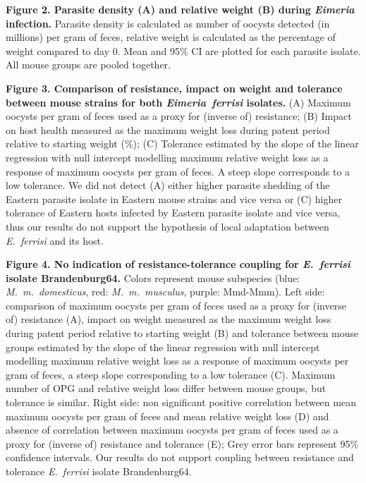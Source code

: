 \documentclass[12pt]{article}
\begin{document}
\textbf{Figure 2. Parasite density (A) and relative weight (B) during \textit{Eimeria} infection.} Parasite density is calculated as number of oocysts detected (in millions) per gram of feces, relative weight is calculated as the percentage of weight compared to day 0. Mean and 95\% CI are plotted for each parasite isolate. All mouse groups are pooled together.

\textbf{Figure 3. Comparison of resistance, impact on weight and tolerance between mouse strains for both \textit{Eimeria~ferrisi} isolates.} (A) Maximum oocysts per gram of feces used as a proxy for (inverse of) resistance; (B) Impact on host health measured as the maximum weight loss during patent period relative to starting weight (\%); (C) Tolerance estimated by the slope of the linear regression with null intercept modelling maximum relative weight loss as a response of maximum oocysts per gram of feces. A steep slope corresponds to a low tolerance. We did not detect (A) either higher parasite shedding of the Eastern parasite isolate in Eastern mouse strains and vice versa or (C) higher tolerance of Eastern hosts infected by Eastern parasite isolate and vice versa, thus our results do not support the hypothesis of local adaptation between \textit{E.~ferrisi} and its host.

\textbf{Figure 4. No indication of resistance-tolerance coupling for \textit{E.~ferrisi} isolate Brandenburg64.} Colors represent mouse subspecies (blue: \textit{M.~m.~domesticus}, red: \textit{M.~m.~musculus}, purple: Mmd-Mmm). Left side: comparison of maximum oocysts per gram of feces used as a proxy for (inverse of) resistance (A), impact on weight measured as the maximum weight loss during patent period relative to starting weight (B) and tolerance between mouse groups estimated by the slope of the linear regression with null intercept modelling maximum relative weight loss as a response of maximum oocysts per gram of feces, a steep slope corresponding to a low tolerance (C). Maximum number of OPG and relative weight loss differ between mouse groups, but tolerance is similar. Right side: non significant positive correlation between mean maximum oocysts per gram of feces and mean relative weight loss (D) and absence of correlation between maximum oocysts per gram of feces used as a proxy for (inverse of) resistance and tolerance (E); Grey error bars represent 95\% confidence intervals. Our results do not support coupling between resistance and tolerance \textit{E.~ferrisi} isolate Brandenburg64.
\end{document}
